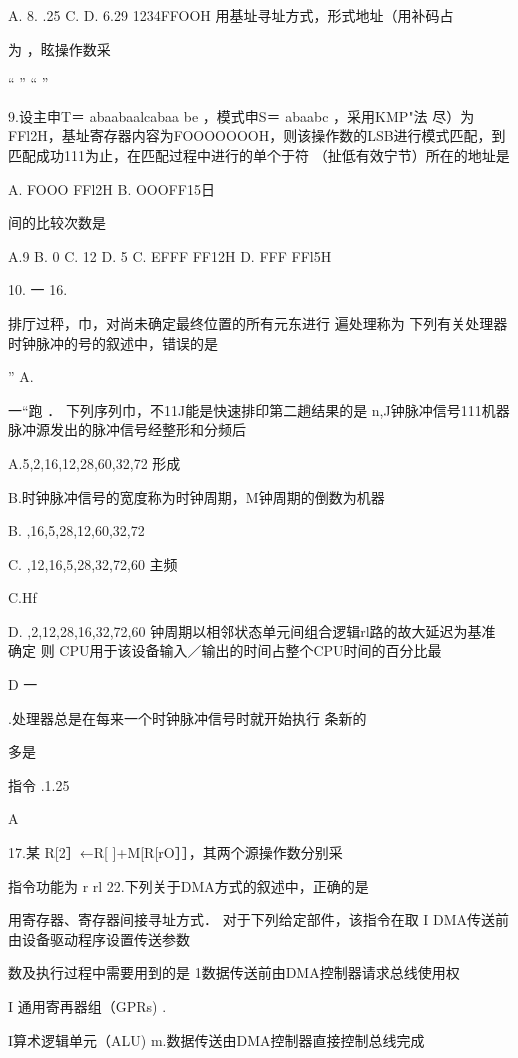 {   A.      8. .25     C.      D. 6.29    1234FFOOH    用基址寻址方式，形式地址（用补码占

    为    ，眩操作数采

    “    ”    “    ”

9.设主申T＝ abaabaalcabaa be ，模式申S＝ abaabc ，采用KMP"法    尽）为FFl2H，基址寄存器内容为FOOOOOOOH，则该操作数的LSB进行模式匹配，到匹配成功111为止，在匹配过程中进行的单个于符    （扯低有效宁节）所在的地址是

    A. FOOO FFl2H     B. OOOFF15日

   间的比较次数是

   A.9    B. 0     C. 12    D. 5     C. EFFF FF12H     D. FFF FFl5H

10.    一    16.

    排厅过秤，巾，对尚未确定最终位置的所有元东进行  遍处理称为    下列有关处理器时钟脉冲的号的叙述中，错误的是

    ”    A.

    一“跑 ． 下列序列巾，不11J能是快速排印第二趟结果的是    n,J钟脉冲信号111机器脉冲源发出的脉冲信号经整形和分频后

    A.5,2,16,12,28,60,32,72    形成

    B.时钟脉冲信号的宽度称为时钟周期，M钟周期的倒数为机器

    B. ,16,5,28,12,60,32,72

    C. ,12,16,5,28,32,72,60    主频

    C.Hf

    D. ,2,12,28,16,32,72,60    钟周期以相邻状态单元间组合逻辑rl路的故大延迟为基准    确定    则 CPU用于该设备输入／输出的时间占整个CPU时间的百分比最

   D    一

    .处理器总是在每来一个时钟脉冲信号时就开始执行  条新的

    多是

    指令    .1.25%

    A

17.某    R[2］←R[ ]+M[R[rO］］，其两个源操作数分别采

    指令功能为   r    rl    22.下列关于DMA方式的叙述中，正确的是

   用寄存器、寄存器间接寻址方式． 对于下列给定部件，该指令在取    I DMA传送前由设备驱动程序设置传送参数

   数及执行过程中需要用到的是    1数据传送前由DMA控制器请求总线使用权

   I 通用寄再器组（GPRs)    .

    I算术逻辑单元（ALU)    m.数据传送由DMA控制器直接控制总线完成

}
